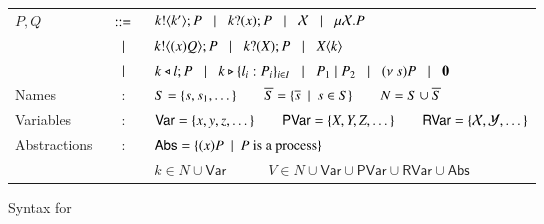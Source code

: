 \begin{figure}
		\begin{tabular}{lcl}
			$P,Q$	&$\;\;::=\;\;$&	$k ! \langle k' \rangle ; P \;\;\;|\;\;\; k ? (x) ; P \;\;\;|\;\;\; \mathcal{X} \;\;\;|\;\;\; \mu \mathcal{X}. P$\\
			&$\;\;\;|\;\;\;$&	$k ! \langle (x)Q \rangle ; P \;\;\;|\;\;\; k ? (X) ; P \;\;\;|\;\;\; X\langle k \rangle$\\ 
			&$\;\;\;|\;\;\;$&	$k \triangleleft l ; P \;\;\;|\;\;\; k \triangleright \{l_i:P_i\}_{i \in I} \;\;\;|\;\;\; 
					P_1 \;|\; P_2 \;\;\;|\;\;\; (\nu\ s) P \;\;\;|\;\;\; \mathbf{0}$\\
			Names & : & 	$S = \{s, s_1, \dots\} \qquad \overline{S} = \{\overline{s} \ \ |\ \  s \in S\} \qquad N = S \cup \overline{S}$\\
			Variables & : &	$\mathsf{Var} = \{x,y,z, \dots\} \qquad \mathsf{PVar} = \{X, Y, Z, \dots\}
					\qquad \mathsf{RVar} = \{\mathcal{X}, \mathcal{Y}, \dots\}$\\
			Abstractions & : & $\mathsf{Abs} = \{(x)P \ \ |\ \  P \textrm{ is a process}\}$\\
				& &	$k \in N \cup \mathsf{Var} \quad \qquad V \in N \cup \mathsf{Var} \cup \mathsf{PVar} \cup \mathsf{RVar} \cup \mathsf{Abs}$ 
		\end{tabular}
%
%

	\caption{Syntax for \fHOp \label{fig:syntax}}
\end{figure}

